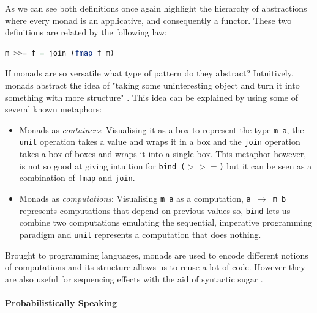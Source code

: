 \documentclass[
  oneside,
  11pt, a4paper,
  footinclude=true,
  headinclude=true,
  cleardoublepage=empty
]{scrbook}
\theoremstyle{definition}
\theoremstyle{definition}
\begin{document}
	            As we can see both definitions once again highlight the hierarchy of abstractions where every monad is an applicative, and consequently a functor. These two definitions are related by the following law:
	            
	            \begin{lstlisting}[mathescape, language=Haskell, caption={Relation between \texttt{join} and \texttt{bind}},captionpos=b]
	                    m >>= f = join (fmap f m) 
	            \end{lstlisting}{}
	            
	            If monads are so versatile what type of pattern do they abstract? Intuitively, monads abstract the idea of "taking some uninteresting object and turn it into something with more structure" \citep{DBLP:journals/corr/abs-1803-10195}. This idea can be explained by using some of several known metaphors:
	            
	            \begin{itemize}
	                \item Monads as \emph{containers}: Visualising it as a box to represent the type \texttt{m a}, the \texttt{unit} operation takes a value and wraps it in a box and the \texttt{join} operation takes a box of boxes and wraps it into a single box. This metaphor however, is not so good at giving intuition for \texttt{bind ($>>=$)} but it can be seen as a combination of \texttt{fmap} and \texttt{join}.
	                
	                \item Monads as \emph{computations}: Visualising \texttt{m a} as a computation, \texttt{a $\rightarrow$ m b} represents computations that depend on previous values so, \texttt{bind} lets us combine two computations emulating the sequential, imperative programming paradigm and \texttt{unit} represents a computation that does nothing.
	            \end{itemize}{}
	            
	            Brought to programming languages, monads are used to encode different notions of computations and its structure allows us to reuse a lot of code. However they are also useful for sequencing effects with the aid of syntactic sugar \citep{wiki:xxx}.
	        
	        \paragraph{Probabilistically Speaking}
	            
\end{document}
